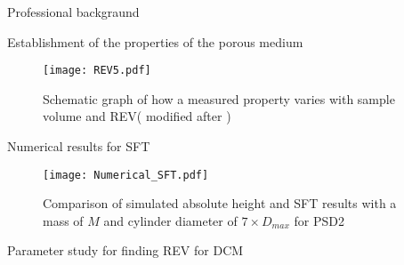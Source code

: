 \documentclass[10pt,xcolor=dvipsnames]{beamer}
\begin{document}
{\begin{frame}{Professional backgraund}
{\usenavigationsymbolstemplate{}
%
%
\begin{frame}{Establishment of the properties of the porous medium}
\begin{figure}[H]
\centering
\texttt{[image: REV5.pdf]} 
\vspace{-0.2cm}
\caption{Schematic graph of how a measured property varies with
sample volume and REV( modified after \cite{bear2012hydraulics})}
\end{figure}
\end{frame}
}

\begin{frame}{Numerical results for SFT}


\begin{figure}[H]
   \centering
\texttt{[image: Numerical\_SFT.pdf]} 
        \caption{Comparison of simulated absolute height and SFT results with a mass of $ M $ and cylinder diameter of $ 7 \times D_{max}$ for PSD2}
        \label{fig:Comparison_simulation_Test}
\end{figure}
\end{frame}



{
\usenavigationsymbolstemplate{}
\begin{frame}{Parameter study for finding REV for DCM}

{\scriptsize
\begin{table}[b]


\end{table}}
\end{frame}}
\end{frame}}
\end{document}
